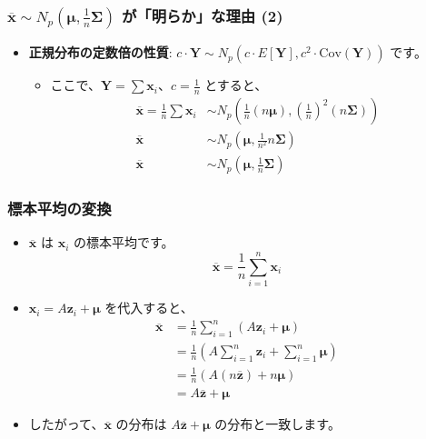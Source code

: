 \documentclass{beamer}
\begin{document}
\begin{frame}
\frametitle{$\overline{\bm{x}}\sim N_{p}(\bm{\mu},\frac{1}{n}\bm{\Sigma})$ が「明らか」な理由 (2)}
\begin{itemize}
    \item \textbf{正規分布の定数倍の性質}: $c\cdot\bm{Y}\sim N_{p}(c\cdot E[\bm{Y}],c^2\cdot\text{Cov}(\bm{Y}))$ です。
    \begin{itemize}
        \item ここで、$\bm{Y}=\sum\bm{x}_i$、$c=\frac{1}{n}$ とすると、
        \begin{align*}
        \overline{\bm{x}}=\frac{1}{n}\sum\bm{x}_i&\sim N_{p}\left(\frac{1}{n}(n\bm{\mu}),\left(\frac{1}{n}\right)^2(n\bm{\Sigma})\right) \\
        \overline{\bm{x}}&\sim N_{p}\left(\bm{\mu},\frac{1}{n^2}n\bm{\Sigma}\right) \\
        \overline{\bm{x}}&\sim N_{p}\left(\bm{\mu},\frac{1}{n}\bm{\Sigma}\right)
        \end{align*}
    \end{itemize}
\end{itemize}
\end{frame}

\begin{frame}
\frametitle{標本平均の変換}
\begin{itemize}
    \item $\overline{\bm{x}}$ は $\bm{x}_i$ の標本平均です。
    \[
    \overline{\bm{x}} = \frac{1}{n}\sum_{i=1}^{n}\bm{x}_i
    \]
    \item $\bm{x}_i = A\bm{z}_i + \bm{\mu}$ を代入すると、
    \begin{align*}
        \overline{\bm{x}} &= \frac{1}{n}\sum_{i=1}^{n}(A\bm{z}_i + \bm{\mu}) \\
        &= \frac{1}{n}\left(A\sum_{i=1}^{n}\bm{z}_i + \sum_{i=1}^{n}\bm{\mu}\right) \\
        &= \frac{1}{n}\left(A(n\overline{\bm{z}}) + n\bm{\mu}\right) \\
        &= A\overline{\bm{z}} + \bm{\mu}
    \end{align*}
    \item したがって、$\overline{\bm{x}}$ の分布は $A\overline{\bm{z}} + \bm{\mu}$ の分布と一致します。
\end{itemize}
\end{frame}
\end{document}
